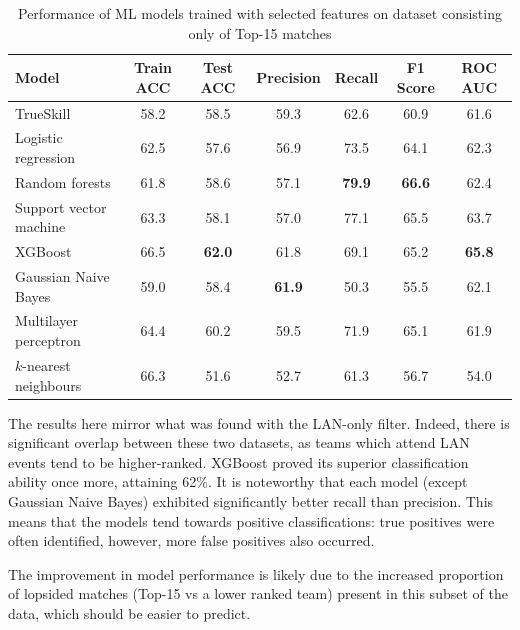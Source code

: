 \begin{table}[h!]
	\centering
	\small
	\begin{adjustbox}{center} %
		\begin{tabular}{ |l|c|c|c|c|c|c| }
			\hline
			\rule{0pt}{2.6ex} \textbf{Model} & \textbf{Train ACC} & \textbf{Test ACC} & \textbf{Precision} & \textbf{Recall} & \textbf{F1 Score} & \textbf{ROC AUC} \\
			\hline
			\rule{0pt}{2.6ex} TrueSkill 				& 58.2 & 58.5 & 59.3 & 62.6 & 60.9 & 61.6 \\ \hline
			\rule{0pt}{2.6ex} Logistic regression 		& 62.5 & 57.6 & 56.9 & 73.5 & 64.1 & 62.3 \\
			\rule{0pt}{2.6ex} Random forests			& 61.8 & 58.6 & 57.1 & \textbf{79.9} & \textbf{66.6} & 62.4 \\
			\rule{0pt}{2.6ex} Support vector machine 	& 63.3 & 58.1 & 57.0 & 77.1 & 65.5 & 63.7 \\
			\rule{0pt}{2.6ex} XGBoost 					& 66.5 & \textbf{62.0} & 61.8 & 69.1 & 65.2 & \textbf{65.8} \\
			\rule{0pt}{2.6ex} Gaussian Naive Bayes 		& 59.0 & 58.4 & \textbf{61.9} & 50.3 & 55.5 & 62.1 \\
			\rule{0pt}{2.6ex} Multilayer perceptron     & 64.4 & 60.2 & 59.5 & 71.9 & 65.1 & 61.9 \\
			\rule{0pt}{2.6ex} $k$-nearest neighbours 	& 66.3 & 51.6 & 52.7 & 61.3 & 56.7 & 54.0 \\
			\hline
		\end{tabular}
	\end{adjustbox}
	\caption{Performance of ML models trained with selected features on dataset consisting only of Top-15 matches}
	\label{table:5}
\end{table}

The results here mirror what was found with the LAN-only filter. Indeed, there is significant overlap between these two datasets, as teams which attend LAN events tend to be higher-ranked. XGBoost proved its superior classification ability once more, attaining 62\%. It is noteworthy that each model (except Gaussian Naive Bayes) exhibited significantly better recall than precision. This means that the models tend towards positive classifications: true positives were often identified, however, more false positives also occurred.

The improvement in model performance is likely due to the increased proportion of lopsided matches (Top-15 vs a lower ranked team) present in this subset of the data, which should be easier to predict.

